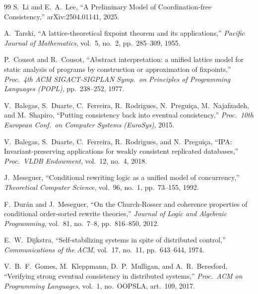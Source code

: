 \documentclass[11pt,a4paper]{article}
\theoremstyle{plain}
\theoremstyle{definition}
\theoremstyle{remark}
\renewcommand{\_}{\origunderscore\allowbreak}
\begin{document}
\begin{thebibliography}{99}
S.~Li and E.~A.~Lee,
``A Preliminary Model of Coordination-free Consistency,''
arXiv:2504.01141, 2025.

A.~Tarski,
``A lattice-theoretical fixpoint theorem and its applications,''
\emph{Pacific Journal of Mathematics}, vol.~5, no.~2, pp.~285--309, 1955.

P.~Cousot and R.~Cousot,
``Abstract interpretation: a unified lattice model for static analysis of programs by construction or approximation of fixpoints,''
\emph{Proc.\ 4th ACM SIGACT-SIGPLAN Symp.\ on Principles of Programming Languages (POPL)}, pp.~238--252, 1977.

V.~Balegas, S.~Duarte, C.~Ferreira, R.~Rodrigues, N.~Pregui\c{c}a, M.~Najafzadeh, and M.~Shapiro,
``Putting consistency back into eventual consistency,''
\emph{Proc.\ 10th European Conf.\ on Computer Systems (EuroSys)}, 2015.

V.~Balegas, S.~Duarte, C.~Ferreira, R.~Rodrigues, and N.~Pregui\c{c}a,
``IPA: Invariant-preserving applications for weakly consistent replicated databases,''
\emph{Proc.\ VLDB Endowment}, vol.~12, no.~4, 2018.

J.~Meseguer,
``Conditional rewriting logic as a unified model of concurrency,''
\emph{Theoretical Computer Science}, vol.~96, no.~1, pp.~73--155, 1992.

F.~Dur\'an and J.~Meseguer,
``On the Church-Rosser and coherence properties of conditional order-sorted rewrite theories,''
\emph{Journal of Logic and Algebraic Programming}, vol.~81, no.~7--8, pp.~816--850, 2012.

E.~W.~Dijkstra,
``Self-stabilizing systems in spite of distributed control,''
\emph{Communications of the ACM}, vol.~17, no.~11, pp.~643--644, 1974.

V.~B.~F.~Gomes, M.~Kleppmann, D.~P.~Mulligan, and A.~R.~Beresford,
``Verifying strong eventual consistency in distributed systems,''
\emph{Proc.\ ACM on Programming Languages}, vol.~1, no.~OOPSLA, art.~109, 2017.

\end{thebibliography}
\end{document}
